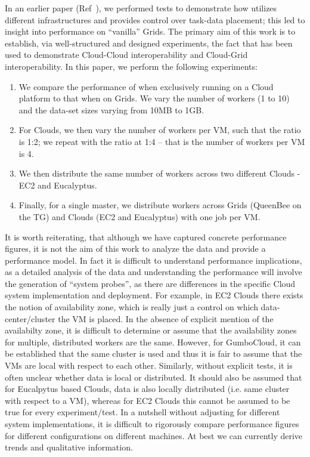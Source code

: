 \documentclass[3p,twocolumn]{elsarticle}
\begin{document}
In an earlier paper (Ref~\cite{saga_ccgrid09}), we performed tests to
demonstrate how \sagamapreduce utilizes different infrastructures and
provides control over task-data placement; this led to insight into
performance on ``vanilla'' Grids. The primary aim of this work is to
establish, via well-structured and designed experiments, the fact that
\sagamapreduce has been used to demonstrate Cloud-Cloud
interoperability and Cloud-Grid interoperability. In this paper, we
perform the following experiments:
\begin{enumerate}
\item We compare the performance of \sagamapreduce when exclusively
  running on a Cloud platform to that when on Grids. We vary the
  number of workers (1 to 10) and the data-set sizes varying from 10MB
  to 1GB.
\item For Clouds, we then vary the number of workers per VM, such that
  the ratio is 1:2; we repeat with the ratio at 1:4 -- that is the
  number of workers per VM is 4.
\item We then distribute the same number of workers across two
  different Clouds - EC2 and Eucalyptus.
\item Finally, for a single master, we distribute workers across Grids
  (QueenBee on the TG) and Clouds (EC2 and Eucalyptus) with one job
  per VM.
\end{enumerate}
It is worth reiterating, that although we have captured concrete
performance figures, it is not the aim of this work to analyze the
data and provide a performance model. In fact it is difficult to
understand performance implications, as a detailed analysis of the
data and understanding the performance will involve the generation of
``system probes'', as there are differences in the specific Cloud
system implementation and deployment.  For example, in EC2 Clouds %
there exists the notion of availability zone, which is really just a
control on which data-center/cluster the VM is placed. In the absence
of explicit mention of the availabilty zone, it is difficult to
determine or assume that the availability zones for multiple,
distributed workers are the same. However, for GumboCloud, it can be
established that the same cluster is used and thus it is fair to
assume that the VMs are local with respect to each other.  Similarly,
without explicit tests, it is often unclear whether data is local or
distributed.  It should also be assumed that for Eucalpytus based
Clouds, data is also locally distributed (i.e.  same cluster with
respect to a VM), whereas for EC2 Clouds this cannot be assumed to be
true for every experiment/test. In a nutshell without adjusting for
different system implementations, it is difficult to rigorously
compare performance figures for different configurations on different
machines. At best we can currently derive trends and qualitative
information.
\end{document}
